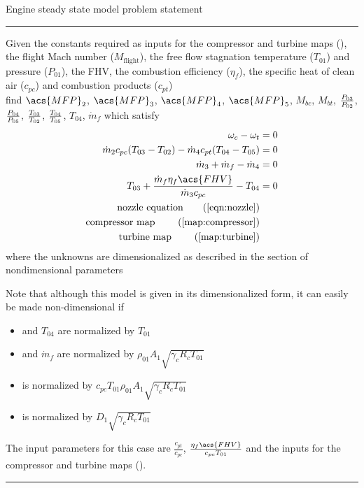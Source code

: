 \begin{table}[b]
\centering
    \caption{Engine steady state model problem statement}
    \label{map:engine}
\begin{minipage}{0.7\textwidth}
    \hrule\vspace{2pt}

    Given the constants required as inputs for the compressor and turbine maps (), 
    the flight Mach number ($M_\text{flight}$), the free flow stagnation temperature ($T_{01}$) and pressure ($P_{01}$), 
    the \acf{FHV}, the combustion efficiency ($\eta_f$),
    the specific heat of clean air ($c_{pc}$) and combustion products ($c_{pt}$) \\ 
    find $\acs{MFP}_2$, $\acs{MFP}_3$, $\acs{MFP}_4$, $\acs{MFP}_5$, $M_{bc}$, $M_{bt}$, $\frac{P_{03}}{P_{02}}$, $\frac{P_{04}}{P_{05}}$, $\frac{T_{03}}{T_{02}}$, $\frac{T_{04}}{T_{05}}$, $T_{04}$, $\dot{m}_f$
    which satisfy
\begin{align}
    \omega_c - \omega_t &= 0 \label{eqn:engine:rotation} \\
    \dot{m}_2 c_{pc} (T_{03}-T_{02}) - \dot{m}_4 c_{pt}(T_{04}-T_{05}) &= 0 \label{eqn:engine:energy}\\
    \dot{m}_3 + \dot{m}_f - \dot{m}_4 &= 0 \label{eqn:engine:mass} \\
    T_{03} + \frac{\dot{m}_f \eta_f \acs{FHV}}{\dot{m}_3 c_{pc}} - T_{04} &= 0 \label{eqn:engine:burn} \\
    \text{nozzle equation} \tag{\Cref{eqn:nozzle}} \\
    \text{compressor map } \tag{\Cref{map:compressor}} \\
    \text{turbine map    } \tag{\Cref{map:turbine}}
\end{align}
   where the unknowns are dimensionalized as described in the section of nondimensional parameters

Note that although this model is given in its dimensionalized form, it can easily be made non-dimensional if
\begin{itemize}
    \item {} and $T_{04}$ are normalized by $T_{01}$
    \item {} and $\dot{m}_f$ are normalized by $\rho_{01} A_1 \sqrt{\gamma_c R_c T_{01}}$
    \item {} is normalized by $c_{pc} T_{01} \rho_{01} A_1 \sqrt{\gamma_c R_c T_{01}}$
    \item {} is normalized by $D_1\sqrt{\gamma_c R_c T_{01}}$
\end{itemize}
    The input parameters for this case are $\frac{c_{pt}}{c_{pc}}$, $\frac{\eta_f \acs{FHV}}{c_{pc} T_{01}}$ 
and the inputs for the compressor and turbine maps ().

    \hrule
\end{minipage}
\end{table}


